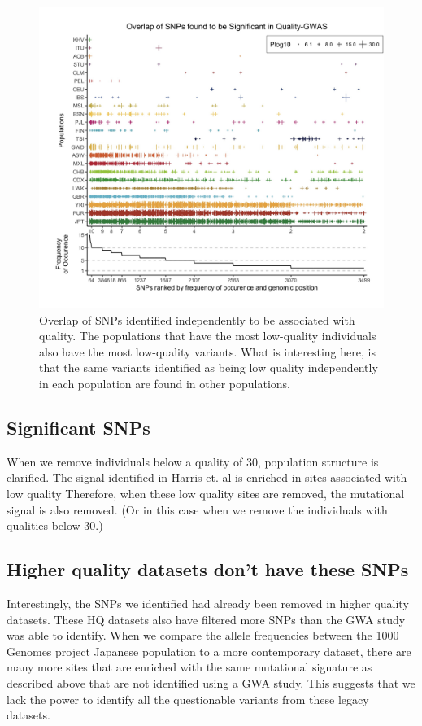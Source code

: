 \documentclass[]{elife}
\begin{document}
\begin{figure}
\includegraphics[width=\hsize,keepaspectratio]{SNPOverlap6.jpg}

\caption{Overlap of SNPs identified independently to be associated with quality. The populations that have the most low-quality individuals also have the most low-quality variants. What is interesting here, is that the same variants identified as being low quality independently in each population are found in other populations. }
  \label{Figure3}
\end{figure}

	\subsection{Significant SNPs}
When we remove individuals below a quality of 30, population structure is clarified. 
The signal identified in Harris et. al is enriched in sites associated with low quality
Therefore, when these low quality sites are removed, the mutational signal is also removed. (Or in this case when we remove the individuals with qualities below 30.)

	\subsection{Higher quality datasets don't have these SNPs}

Interestingly, the SNPs we identified had already been removed in higher quality datasets. 
These HQ datasets also have filtered more SNPs than the GWA study was able to identify. 
When we compare the allele frequencies between the 1000 Genomes project Japanese population to a more contemporary dataset, there are many more sites that are enriched with the same mutational signature as described above that are not identified using a GWA study. 
This suggests that we lack the power to identify all the questionable variants from these legacy datasets. 
\end{document}
